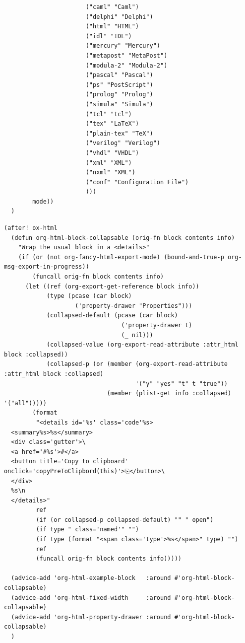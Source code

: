 \documentclass[11pt]{article}
\begin{document}
\begin{verbatim}
                       ("caml" "Caml")
                       ("delphi" "Delphi")
                       ("html" "HTML")
                       ("idl" "IDL")
                       ("mercury" "Mercury")
                       ("metapost" "MetaPost")
                       ("modula-2" "Modula-2")
                       ("pascal" "Pascal")
                       ("ps" "PostScript")
                       ("prolog" "Prolog")
                       ("simula" "Simula")
                       ("tcl" "tcl")
                       ("tex" "LaTeX")
                       ("plain-tex" "TeX")
                       ("verilog" "Verilog")
                       ("vhdl" "VHDL")
                       ("xml" "XML")
                       ("nxml" "XML")
                       ("conf" "Configuration File")
                       )))
        mode))
  )
\end{verbatim}

\begin{verbatim}
(after! ox-html
  (defun org-html-block-collapsable (orig-fn block contents info)
    "Wrap the usual block in a <details>"
    (if (or (not org-fancy-html-export-mode) (bound-and-true-p org-msg-export-in-progress))
        (funcall orig-fn block contents info)
      (let ((ref (org-export-get-reference block info))
            (type (pcase (car block)
                    ('property-drawer "Properties")))
            (collapsed-default (pcase (car block)
                                 ('property-drawer t)
                                 (_ nil)))
            (collapsed-value (org-export-read-attribute :attr_html block :collapsed))
            (collapsed-p (or (member (org-export-read-attribute :attr_html block :collapsed)
                                     '("y" "yes" "t" t "true"))
                             (member (plist-get info :collapsed) '("all")))))
        (format
         "<details id='%s' class='code'%s>
  <summary%s>%s</summary>
  <div class='gutter'>\
  <a href='#%s'>#</a>
  <button title='Copy to clipboard' onclick='copyPreToClipbord(this)'>⎘</button>\
  </div>
  %s\n
  </details>"
         ref
         (if (or collapsed-p collapsed-default) "" " open")
         (if type " class='named'" "")
         (if type (format "<span class='type'>%s</span>" type) "")
         ref
         (funcall orig-fn block contents info)))))

  (advice-add 'org-html-example-block   :around #'org-html-block-collapsable)
  (advice-add 'org-html-fixed-width     :around #'org-html-block-collapsable)
  (advice-add 'org-html-property-drawer :around #'org-html-block-collapsable)
  )
\end{verbatim}
\end{document}
